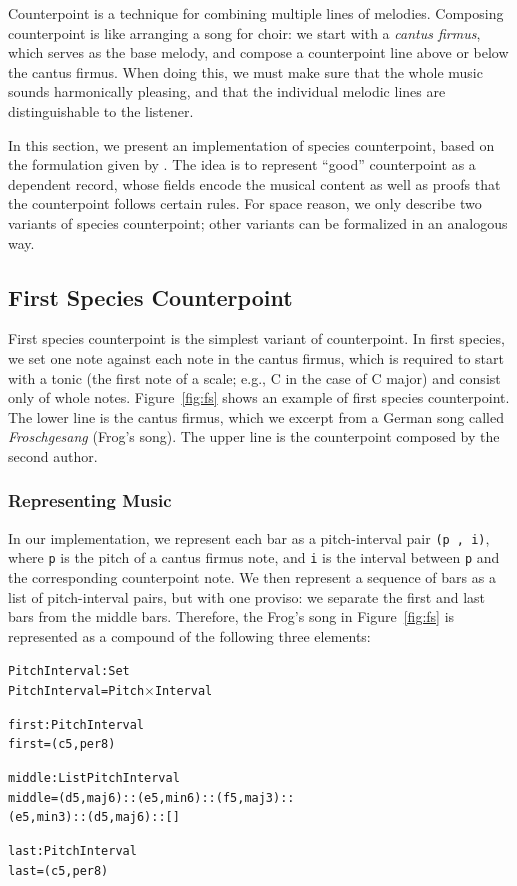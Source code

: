 Counterpoint is a technique for combining multiple lines of melodies.
Composing counterpoint is like arranging a song for choir:
we start with a \emph{cantus firmus}, which serves as the base melody,
and compose a counterpoint line above or below the cantus firmus.
When doing this, we must make sure that the whole music sounds
harmonically pleasing, and that the individual melodic lines are
distinguishable to the listener.

In this section, we present an implementation of species counterpoint,
based on the formulation given by \citet{fux-cp}.
The idea is to represent ``good'' counterpoint  as a dependent record,
whose fields encode the musical content as well as proofs that the
counterpoint follows certain rules.
For space reason, we only describe two variants of species counterpoint;
other variants can be formalized in an analogous way.

\subsection{First Species Counterpoint}
\label{sec:cp:fs}

\FS

First species counterpoint is the simplest variant of counterpoint.
In first species, we set one note against each note in the cantus firmus,
which is required to start with a tonic (the first note of a scale;
e.g., C in the case of C major) and consist only of whole notes.
Figure~\ref{fig:fs} shows an example of first species counterpoint.
The lower line is the cantus firmus, which we excerpt from a German
song called \emph{Froschgesang} (Frog's song).
The upper line is the counterpoint composed by the second author.

\subsubsection{Representing Music}

In our implementation, we represent each bar as a pitch-interval pair
\texttt{(p ,  i)}, where \texttt{p} is the pitch of a cantus firmus note,
and \texttt{i} is the interval between \texttt{p} and the corresponding
counterpoint note.
We then represent a sequence of bars as a list of pitch-interval pairs,
but with one proviso: we separate the first and last bars from the
middle bars.
Therefore, the Frog's song in Figure~\ref{fig:fs} is represented as a
compound of the following three elements:

\begin{alltt}
PitchInterval : Set
PitchInterval = Pitch \(\times\) Interval
  
first : PitchInterval
first = (c 5 , per8)

middle : List PitchInterval
middle = (d 5 , maj6) :: (e 5 , min6) :: (f 5 , maj3) ::
         (e 5 , min3) :: (d 5 , maj6) :: []

last : PitchInterval
last = (c 5 , per8)
\end{alltt}

